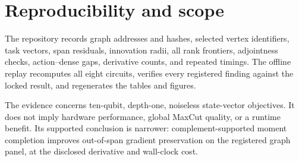 \documentclass[10pt,letterpaper,twoside]{article}
\begin{document}
\begin{table}[t]
\caption{\label{tab:resource}Dimensions and exact transpose-Jacobian counts.
Here $m$ is the number of local edge observables, $d$ the parameter dimension,
and $\rho$ the development-moment rank.}
\centering\scriptsize

\end{table}

\section{Reproducibility and scope}

The repository records graph addresses and hashes, selected vertex identifiers,
task vectors, span residuals, innovation radii, all rank frontiers, adjointness
checks, action--dense gaps, derivative counts, and repeated timings.  The
offline replay recomputes all eight circuits, verifies every registered
finding against the locked result, and regenerates the tables and figures.

The evidence concerns ten-qubit, depth-one, noiseless state-vector objectives.
It does not imply hardware performance, global MaxCut quality, or a runtime
benefit.  Its supported conclusion is narrower: complement-supported moment
completion improves out-of-span gradient preservation on the registered graph
panel, at the disclosed derivative and wall-clock cost.



\end{document}
